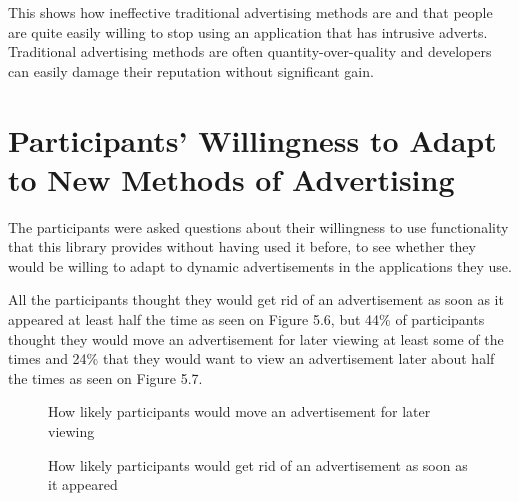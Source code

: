 This shows how ineffective traditional advertising methods are and that people are quite easily willing to stop using an application that has intrusive adverts. Traditional advertising methods are often quantity-over-quality and developers can easily damage their reputation without significant gain.

\section{Participants' Willingness to Adapt to New Methods of Advertising}

The participants were asked questions about their willingness to use functionality that this library provides without having used it before, to see whether they would be willing to adapt to dynamic advertisements in the applications they use.

All the participants thought they would get rid of an advertisement as soon as it appeared at least half the time as seen on Figure 5.6, but 44\% of participants thought they would move an advertisement for later viewing at least some of the times and 24\% that they would want to view an advertisement later about half the times as seen on Figure 5.7.

\begin{figure}
\begin{center}
\caption{How likely participants would move an advertisement for later viewing}
\end{center}
\end{figure}

\begin{figure}
\begin{center}
\caption{How likely participants would get rid of an advertisement as soon as it appeared}
\end{center}
\end{figure}

